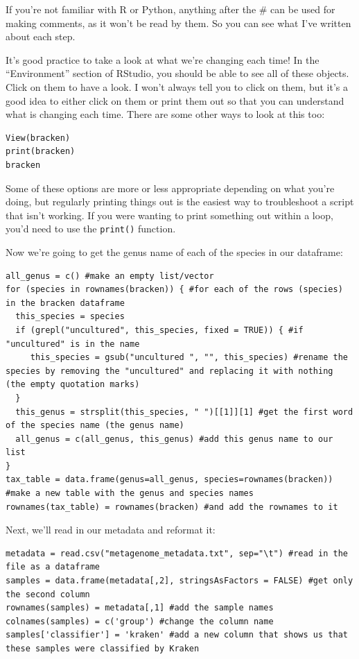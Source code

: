 \documentclass[
]{book}
\begin{document}
If you're not familiar with R or Python, anything after the \# can be used for making comments, as it won't be read by them. So you can see what I've written about each step.

It's good practice to take a look at what we're changing each time! In the ``Environment'' section of RStudio, you should be able to see all of these objects. Click on them to have a look. I won't always tell you to click on them, but it's a good idea to either click on them or print them out so that you can understand what is changing each time. There are some other ways to look at this too:

\begin{verbatim}
View(bracken)
print(bracken)
bracken
\end{verbatim}

Some of these options are more or less appropriate depending on what you're doing, but regularly printing things out is the easiest way to troubleshoot a script that isn't working. If you were wanting to print something out within a loop, you'd need to use the \texttt{print()} function.

Now we're going to get the genus name of each of the species in our dataframe:

\begin{verbatim}
all_genus = c() #make an empty list/vector
for (species in rownames(bracken)) { #for each of the rows (species) in the bracken dataframe
  this_species = species
  if (grepl("uncultured", this_species, fixed = TRUE)) { #if "uncultured" is in the name
     this_species = gsub("uncultured ", "", this_species) #rename the species by removing the "uncultured" and replacing it with nothing (the empty quotation marks)
  }
  this_genus = strsplit(this_species, " ")[[1]][1] #get the first word of the species name (the genus name)
  all_genus = c(all_genus, this_genus) #add this genus name to our list
}
tax_table = data.frame(genus=all_genus, species=rownames(bracken)) #make a new table with the genus and species names
rownames(tax_table) = rownames(bracken) #and add the rownames to it
\end{verbatim}

Next, we'll read in our metadata and reformat it:

\begin{verbatim}
metadata = read.csv("metagenome_metadata.txt", sep="\t") #read in the file as a dataframe
samples = data.frame(metadata[,2], stringsAsFactors = FALSE) #get only the second column
rownames(samples) = metadata[,1] #add the sample names
colnames(samples) = c('group') #change the column name
samples['classifier'] = 'kraken' #add a new column that shows us that these samples were classified by Kraken
\end{verbatim}
\end{document}
